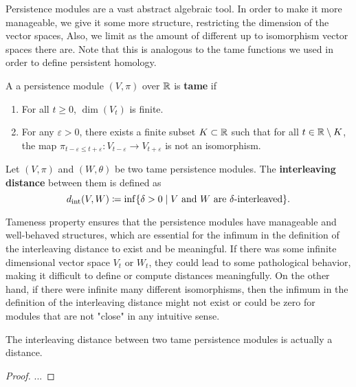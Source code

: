 Persistence modules are a vast abstract algebraic tool. In order to make it more manageable, we give it some more structure, restricting the dimension of the vector spaces, Also, we limit as the amount of different up to isomorphism vector spaces there are. Note that this is analogous to the tame functions we used in order to define persistent homology.

\begin{definition}
    A a persistence module $ (V, \pi) $ over $ \mathbb R $ is {\bf tame} if
    \begin{enumerate}
        \renewcommand{\labelenumi}{(\roman{enumi})}
        \item For all $ t \geq 0 $, $ \dim(V_t) $ is finite.
        \item For any $\varepsilon > 0 $, there exists a finite subset $ K \subset \mathbb R $ such that for all $ t \in \mathbb R \setminus K $, the map $ \pi_{t-\varepsilon \leq t+\varepsilon} \colon V_{t-\varepsilon} \to V_{t+\varepsilon} $ is not an isomorphism.
    \end{enumerate}
\end{definition}

\begin{definition}
    Let $ (V, \pi) $ and $ (W, \theta) $ be two tame persistence modules. The {\bf interleaving distance} between them is defined as
    \begin{equation}
        d_{\operatorname{int}}(V, W) \coloneq \inf \{ \delta > 0 \mid V \text{ and } W \text{ are } \delta\text{-interleaved}\}.
    \end{equation}
\end{definition}

Tameness property ensures that the persistence modules have manageable and well-behaved structures, which are essential for the infimum in the definition of the interleaving distance to exist and be meaningful. If there was some infinite dimensional vector space $ V_t $ or $ W_t$, they could lead to some pathological behavior, making it difficult to define or compute distances meaningfully. On the other hand, if there were infinite many different isomorphisms, then the infimum in the definition of the interleaving distance might not exist or could be zero for modules that are not "close" in any intuitive sense.

\begin{proposition}
    The interleaving distance between two tame persistence modules is actually a distance.
\end{proposition}
\begin{proof}
    ...
\end{proof}

